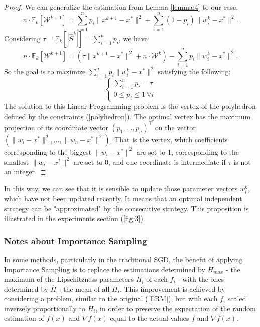 \documentclass{article}
\theoremstyle{definition}
\theoremstyle{assumption}
\theoremstyle{lemma}
\theoremstyle{theorem}
\theoremstyle{proposition}
\begin{document}
	\begin{proof}
		We can generalize the estimation from Lemma \ref{lemma:4} to our case.
		\begin{equation}
			n \cdot \mathbb E_k[\mathcal W^{k+1}] = \sum \limits_{i=1}^n p_i  \| x^{k+1} - x^* \|^2 + \sum \limits_{i=1}^n \left(1 - p_i \right) \|w_i^k - x^*\|^2.
		\end{equation}
		Considering $\tau = \mathbb E_k[|\hat S^k|] = \sum \limits_{i=1}^n p_i$, we have
		\begin{equation}
			n \cdot \mathbb E_k[\mathcal W^{k+1}] = \left( \tau  \| x^{k+1} - x^* \|^2 + n \cdot \mathcal W^k \right) - \sum \limits_{i=1}^n p_i \|w_i^k - x^*\|^2.
		\end{equation}
		So the goal is to maximize $\sum \limits_{i=1}^n p_i \|w_i^k - x^*\|^2$ satisfying the following:
		\begin{equation} \label{polyhedron}
			\begin{cases}
			\sum \limits_{i=1}^n p_i = \tau \\
			0 \leqslant p_i \leqslant 1\ \forall i
			\end{cases}
		\end{equation}
		The solution to this Linear Programming problem is the vertex of the polyhedron defined by the constraints (\ref{polyhedron}). The optimal vertex has the maximum projection of its coordinate vector $(p_1, ..., p_n)^\top$ on the vector $(\|w_i - x^*\|^2, ..., \|w_n - x^*\|^2)$. That is the vertex, which coefficients corresponding to the biggest $\|w_i - x^*\|^2$ are set to 1, corresponding to the smallest $\|w_i - x^*\|^2$ are set to 0, and one coordinate is intermediate if $\tau$ is not an integer.
	\end{proof}

	In this way, we can see that it is sensible to update those parameter vectors $w_i^k$, which have not been updated recently. It means that an optimal independent strategy can be "approximated" by the consecutive strategy. This proposition is illustrated in the experiments section (\ref{fig:3}).
	

	\subsubsection{Notes about Importance Sampling}

	In some methods, particularly in the traditional SGD, the benefit of applying Importance Sampling is to replace the estimations determined by $H_{max}$ - the maximum of the Lipschitzness parameters $H_i$ of each $f_i$ - with the ones determined by $\overline H$ - the mean of all $H_i$. This improvement is achieved by considering a problem, similar to the original (\ref{ERM}), but with each $f_i$ scaled inversely proportionally to $H_i$, in order to preserve the expectation of the random estimation of $f(x)$ and $\nabla f(x)$ equal to the actual values $f$ and $\nabla f(x)$.
	
\end{document}
